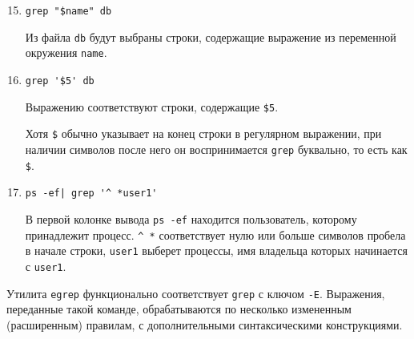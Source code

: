 \documentclass[listings]{labreport}
\begin{document}
\begin{enumerate}
\setcounter{enumi}{14}

\item \verb|grep "$name" db|

Из файла \texttt{db} будут выбраны строки, содержащие выражение из переменной окружения \verb|name|.

\item \verb|grep '$5' db|

Выражению соответствуют строки, содержащие \verb|$5|.

\begin{small}
Хотя \verb|$| обычно указывает на конец строки в регулярном выражении, при наличии символов после него он
воспринимается \texttt{grep} буквально, то есть как \verb|$|. 
\end{small}

\item \verb=ps -ef| grep '^ *user1'=

В первой колонке вывода \verb|ps -ef| находится пользователь, которому принадлежит процесс.
\verb|^ *| соответствует нулю или больше символов пробела в начале строки, \texttt{user1}
выберет процессы, имя владельца которых начинается с \texttt{user1}.

\end{enumerate}

Утилита \texttt{egrep} функционально соответствует \texttt{grep} с ключом \texttt{-E}.
Выражения, переданные такой команде, обрабатываются по несколько измененным (расширенным) правилам,
с дополнительными синтаксическими конструкциями.
\end{document}
